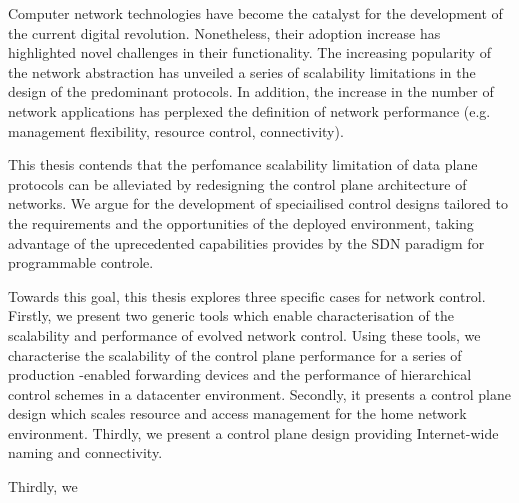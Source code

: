 


\begin{abstractslong}    %

Computer network technologies have become the catalyst for the development of
the current digital revolution. Nonetheless, their adoption increase has
highlighted novel challenges in their functionality. The increasing
popularity of the network abstraction has unveiled a series of scalability
limitations in the design of the predominant protocols. In addition, the
increase in the number of network applications has perplexed the definition of
network performance (e.g. management flexibility, resource control, connectivity). 

This thesis contends that the perfomance scalability limitation of data plane
protocols can be alleviated by redesigning the control plane architecture of
networks. We argue for the development of speciailised control designs tailored
to the requirements and the opportunities of the deployed environment, taking
advantage of the uprecedented capabilities provides by the SDN paradigm for
programmable controle. 

Towards this goal, this thesis explores three specific cases for network
control. Firstly, we present two generic tools which enable characterisation of
the scalability and performance of evolved network control. Using these tools, we
characterise the scalability of the control plane performance for a series of
production \of-enabled forwarding devices and the performance of hierarchical
control schemes in a datacenter environment. Secondly, it presents a control
plane design which scales resource and access management for the home network
environment. Thirdly, we present a control plane design providing Internet-wide
naming and connectivity. 

Thirdly, we 

\end{abstractslong}






